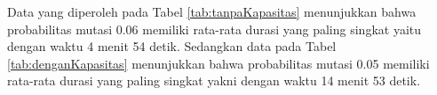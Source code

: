 Data yang diperoleh pada Tabel \ref{tab:tanpaKapasitas} menunjukkan bahwa probabilitas mutasi 0.06 memiliki rata-rata durasi yang paling singkat yaitu dengan waktu 4 menit 54 detik. Sedangkan data pada Tabel \ref{tab:denganKapasitas} menunjukkan bahwa probabilitas mutasi 0.05 memiliki rata-rata durasi yang paling singkat yakni dengan waktu 14 menit 53 detik. 

